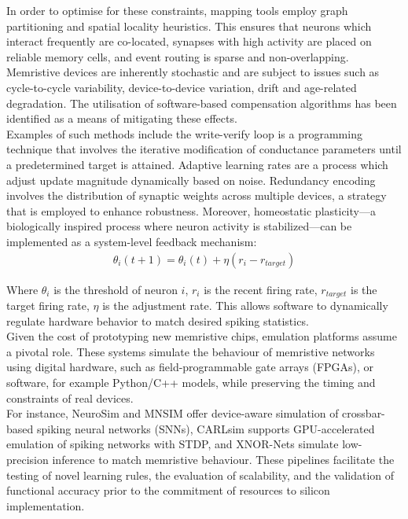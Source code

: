\noindent In order to optimise for these constraints, mapping tools employ graph partitioning and spatial locality heuristics. This ensures that neurons which interact frequently are co-located, synapses with high activity are placed on reliable memory cells, and event routing is sparse and non-overlapping. Memristive devices are inherently stochastic and are subject to issues such as cycle-to-cycle variability, device-to-device variation, drift and age-related degradation. The utilisation of software-based compensation algorithms has been identified as a means of mitigating these effects. \\

\noindent Examples of such methods include the write-verify loop is a programming technique that involves the iterative modification of conductance parameters until a predetermined target is attained. Adaptive learning rates are a process which adjust update magnitude dynamically based on noise. Redundancy encoding involves the distribution of synaptic weights across multiple devices, a strategy that is employed to enhance robustness. Moreover, homeostatic plasticity—a biologically inspired process where neuron activity is stabilized—can be implemented as a system-level feedback mechanism:
\begin{align}
    \theta_i(t + 1) = \theta_i(t) + \eta(r_i - r_{target}) \label{eq:2.43}
\end{align}

\noindent Where $\theta_i$ is the threshold of neuron $i$, $r_i$ is the recent firing rate, $r_{target}$ is the target firing rate, $\eta$ is the adjustment rate. This allows software to dynamically regulate hardware behavior to match desired spiking statistics.\\

\noindent Given the cost of prototyping new memristive chips, emulation platforms assume a pivotal role. These systems simulate the behaviour of memristive networks using digital hardware, such as field-programmable gate arrays (FPGAs), or software, for example Python/C++ models, while preserving the timing and constraints of real devices. \\

\noindent For instance, NeuroSim and MNSIM offer device-aware simulation of crossbar-based spiking neural networks (SNNs), CARLsim supports GPU-accelerated emulation of spiking networks with STDP, and XNOR-Nets simulate low-precision inference to match memristive behaviour. These pipelines facilitate the testing of novel learning rules, the evaluation of scalability, and the validation of functional accuracy prior to the commitment of resources to silicon implementation.\\

